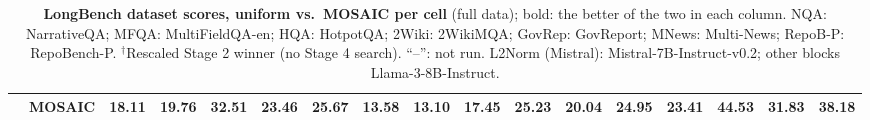 \begin{table}[tp]
\begin{tabular}{@{} c l rrrr rrrr rrrr rrr @{}}
     & MOSAIC & \textbf{18.11} & \textbf{19.76} & \textbf{32.51} & \textbf{23.46} & \textbf{25.67} & \textbf{13.58} & \textbf{13.10} & \textbf{17.45} & \textbf{25.23} & \textbf{20.04} & \textbf{24.95} & \textbf{23.41} & \textbf{44.53} & \textbf{31.83} & \textbf{38.18} \\
    \bottomrule
  \end{tabular}
  \caption{\textbf{LongBench dataset scores, uniform vs.\ MOSAIC per cell} (full data); bold: the better of the two in each column. NQA: NarrativeQA; MFQA: MultiFieldQA-en; HQA: HotpotQA; 2Wiki: 2WikiMQA; GovRep: GovReport; MNews: Multi-News; RepoB-P: RepoBench-P. $^\dagger$Rescaled Stage 2 winner (no Stage 4 search). ``--'': not run. L2Norm (Mistral): Mistral-7B-Instruct-v0.2; other blocks Llama-3-8B-Instruct.}
  \label{tab:app-lb}
\end{table}
